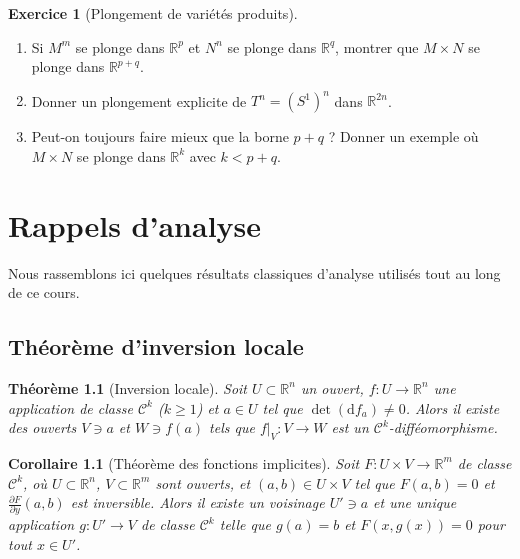 \documentclass[12pt,a4paper,openany]{book}
\theoremstyle{definition}
\newtheorem{exercice}{Exercice}[chapter]
\theoremstyle{plain}
\newtheorem{theoreme}[definition]{Théorème}
\newtheorem{corollaire}[definition]{Corollaire}
\theoremstyle{remark}
\newcommand{\R}{\mathbb{R}}
\newcommand{\dd}{\mathrm{d}}
\begin{document}
\begin{exercice}[Plongement de variétés produits]\label{exo:whitney-11}
\begin{enumerate}[label=(\alph*)]
  \item Si $M^m$ se plonge dans $\R^p$ et $N^n$ se plonge dans $\R^q$, montrer
    que $M \times N$ se plonge dans $\R^{p+q}$.
  \item Donner un plongement explicite de $T^n = (S^1)^n$ dans $\R^{2n}$.
  \item Peut-on toujours faire mieux que la borne $p + q$ ? Donner un exemple où
    $M \times N$ se plonge dans $\R^k$ avec $k < p + q$.
\end{enumerate}
\end{exercice}


\appendix

\chapter{Rappels d'analyse}\label{app:analyse}
\minitoc

\vspace{0.5cm}

Nous rassemblons ici quelques résultats classiques d'analyse utilisés tout au
long de ce cours.

\section{Théorème d'inversion locale}\label{app:inversion-locale}

\begin{theoreme}[Inversion locale]\label{thm:app-inversion}
Soit $U \subset \R^n$ un ouvert, $f : U \to \R^n$ une application de classe
$\mathcal{C}^k$ ($k \geqslant 1$) et $a \in U$ tel que $\det(\dd f_a) \neq 0$.
Alors il existe des ouverts $V \ni a$ et $W \ni f(a)$ tels que
$f|_V : V \to W$ est un $\mathcal{C}^k$-difféomorphisme.
\end{theoreme}

\begin{corollaire}[Théorème des fonctions implicites]\label{cor:app-implicite}
Soit $F : U \times V \to \R^m$ de classe $\mathcal{C}^k$, où
$U \subset \R^n$, $V \subset \R^m$ sont ouverts, et $(a,b) \in U \times V$ tel
que $F(a,b) = 0$ et $\frac{\partial F}{\partial y}(a,b)$ est inversible. Alors
il existe un voisinage $U' \ni a$ et une unique application
$g : U' \to V$ de classe $\mathcal{C}^k$ telle que $g(a) = b$ et
$F(x, g(x)) = 0$ pour tout $x \in U'$.
\end{corollaire}
\end{document}
